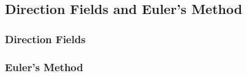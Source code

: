 \subsection{Direction Fields and Euler's Method}
\subsubsection{Direction Fields}

\subsubsection{Euler's Method}